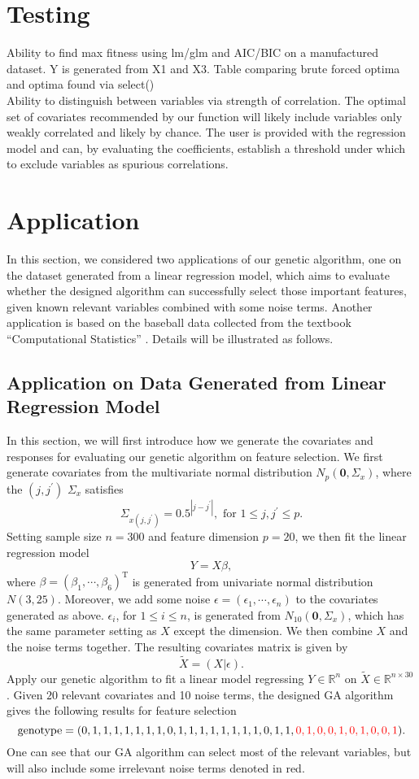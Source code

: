 \documentclass{article}
\begin{document}
\section{Testing}\label{s2}
Ability to find max fitness using lm/glm and AIC/BIC on a manufactured dataset. Y is generated from X1 and X3. Table comparing brute forced optima and optima found via select()\\
Ability to distinguish between variables via strength of correlation. The optimal set of covariates recommended by our function will likely include variables only weakly correlated and likely by chance. The user is provided with the regression model and can, by evaluating the coefficients, establish a threshold under which to exclude variables as spurious correlations.

\section{Application}\label{s3}
In this section, we considered two applications of our genetic algorithm, one on the dataset generated from a linear regression model, which aims to evaluate whether the designed algorithm can successfully select those important features, given known relevant variables combined with some noise terms. Another application is based on the baseball data collected from the textbook ``Computational Statistics'' \citet{compute}. Details will be illustrated as follows.

\subsection{Application on Data Generated from Linear Regression Model}
In this section, we will first introduce how we generate the covariates and responses for evaluating our genetic algorithm on feature selection. We first generate covariates from the multivariate normal distribution $N_{p}(\bm{0}, \Sigma_{x})$, where the $(j, j^{\prime})$ $\Sigma_{x}$ satisfies
$$
\Sigma_{x(j,j^{\prime})} = 0.5^{|j-j^{\prime}|}, \mbox{ for } 1\leq j, j^{\prime}\leq p.
$$
Setting sample size $n=300$ and feature dimension $p=20$, we then fit the linear regression model
$$
Y = X\beta,
$$
where $\beta=(\beta_{1}, \cdots, \beta_{6})^{\mathrm{T}}$ is generated from univariate normal distribution $N(3, 25)$. Moreover, we add some noise $\epsilon=(\epsilon_{1}, \cdots, \epsilon_{n})$ to the covariates generated as above. $\epsilon_{i}$, for $1\leq i \leq n$, is generated from $N_{10}(\bm{0}, \Sigma_{x})$, which has the same parameter setting as $X$ except the dimension. We then combine $X$ and the noise terms together. The resulting covariates matrix is given by
$$
\tilde{X} = (X|\epsilon).
$$
Apply our genetic algorithm to fit a linear model regressing $Y\in \mathbb{R}^{n}$ on $\tilde{X}\in \mathbb{R}^{n\times 30}$. Given $20$ relevant covariates and 10 noise terms, the designed GA algorithm gives the following results for feature selection
$$
\mbox{genotype}=(0, 1, 1, 1, 1, 1, 1, 1, 0, 1, 1, 1, 1, 1, 1, 1, 1, 0, 1, 1, \textcolor{red}{0, 1, 0, 0, 1, 0, 1, 0, 0, 1}).
$$
One can see that our GA algorithm can select most of the relevant variables, but will also include some irrelevant noise terms denoted in red.
\end{document}
